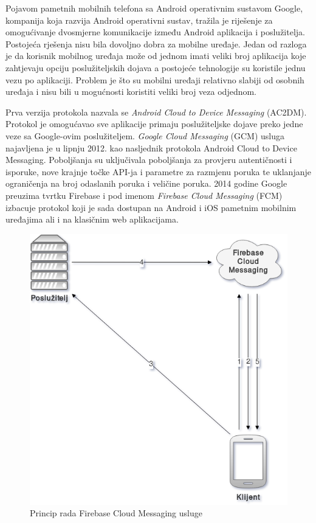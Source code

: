 \documentclass[times, utf8, zavrsni]{fer}
\begin{document}
{Pojavom pametnih mobilnih telefona sa Android operativnim sustavom Google, kompanija koja razvija Android operativni sustav, tražila je riješenje za omogućivanje dvosmjerne komunikacije između Android aplikacija i poslužitelja. Postojeća rješenja nisu bila dovoljno dobra za mobilne uređaje. Jedan od razloga je da korisnik mobilnog uređaja može od jednom imati veliki broj aplikacija koje zahtjevaju opciju poslužiteljskih dojava a postojeće tehnologije su koristile jednu vezu po aplikaciji. Problem je što su mobilni uređaji relativno slabiji od osobnih uređaja i nisu bili u mogućnosti koristiti veliki broj veza odjednom.

Prva verzija protokola nazvala se {\em Android Cloud to Device Messaging} (AC2DM). Protokol je omogućavao sve aplikacije primaju poslužiteljske dojave preko jedne veze sa Google-ovim poslužiteljem. {\em Google Cloud Messaging} (GCM) usluga najavljena je u lipnju 2012. kao nasljednik protokola Android Cloud to Device Messaging. Poboljšanja su uključivala poboljšanja za provjeru autentičnosti i isporuke, nove krajnje točke API-ja i parametre za razmjenu poruka te uklanjanje ograničenja na broj odaslanih poruka i veličine poruka. 2014 godine Google preuzima tvrtku Firebase i pod imenom {\em Firebase Cloud Messaging} (FCM) izbacuje protokol koji je sada dostupan na Android i iOS pametnim mobilnim uređajima ali i na klasičnim web aplikacijama.

\begin{figure}[htb]
\centering
\includegraphics[width=\linewidth]{img/fcm.png}
\caption{Princip rada Firebase Cloud Messaging usluge}
\label{fig:fcm-image}
\end{figure}

}
\end{document}
